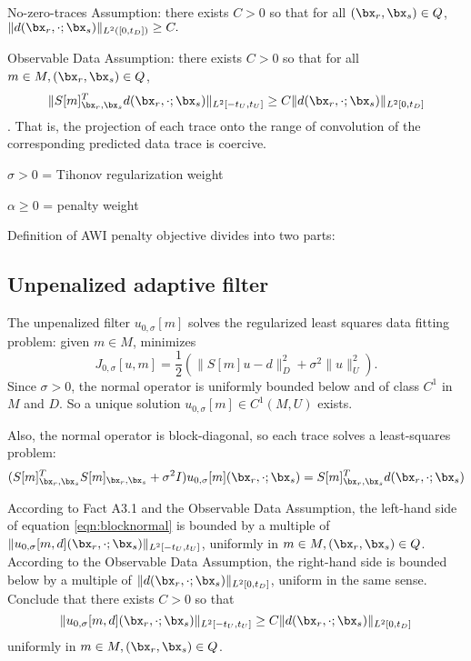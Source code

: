 No-zero-traces Assumption: there exists $C>0$ so that for all $(\bx_r,\bx_s) \in Q$,
$\|d(\bx_r,\cdot;\bx_s)\|_{L^2([0,t_D])} \ge C.$

Observable Data Assumption: there exists $C>0$ so that for all $m \in M, (\bx_r,\bx_s) \in Q$,
\begin{equation}
  \label{eqn:obsdata}
  \|S[m]_{\bx_r,\bx_s}^Td(\bx_r,\cdot;\bx_s)\|_{L^2[-t_U,t_U]} \ge C \|d(\bx_r,\cdot;\bx_s)\|_{L^2[0,t_D]}
\end{equation}.
That is, the projection of each trace onto the range of convolution of the corresponding predicted data trace is coercive.  

$\sigma > 0$ = Tihonov regularization weight

$\alpha \ge 0$ = penalty weight

Definition of AWI penalty objective divides into two parts:

\subsection{ Unpenalized adaptive filter}
The unpenalized filter $u_{0,\sigma}[m]$ solves the regularized least squares data fitting problem:  given $m \in M$, minimizes
\[
 J_{0,\sigma}[u,m] = \frac{1}{2}(\|S[m]u - d\|_D^2 + \sigma^2 \|u\|^2_U).
\]
Since $\sigma > 0$, the normal operator is uniformly bounded below and of class $C^1$ in $M$ and $D$. So a unique solution $u_{0,\sigma}[m] \in C^1(M, U)$ exists.

Also, the normal operator is block-diagonal, so each trace solves a least-squares problem:
\begin{equation}
  \label{eqn:blocknormal}
  (S[m]_{\bx_r,\bx_s}^TS[m]_{\bx_r,\bx_s} + \sigma^2 I)u_{0,\sigma}[m](\bx_r,\cdot; \bx_s)= S[m]_{\bx_r,\bx_s}^Td(\bx_r,\cdot;\bx_s)
\end{equation}

According to Fact A3.1 and the Observable Data Assumption, the left-hand side of equation \ref{eqn:blocknormal} is bounded by a multiple of $\|u_{0,\sigma}[m,d](\bx_r,\cdot; \bx_s)\|_{L^2[-t_U,t_U]}$, uniformly in $m \in M, (\bx_r,\bx_s) \in Q$. According to the Observable Data Assumption, the right-hand side is bounded below by a multiple of $\|d(\bx_r,\cdot;\bx_s)\|_{L^2[0,t_D]}$, uniform in the same sense. Conclude that there exists $C>0$ so that
\begin{equation}
  \label{eqn:u0lower}
  \|u_{0,\sigma}[m,d](\bx_r,\cdot; \bx_s)\|_{L^2[-t_U,t_U]} \ge C \|d(\bx_r,\cdot;\bx_s)\|_{L^2[0,t_D]}
\end{equation}
uniformly in $m \in M, (\bx_r,\bx_s) \in Q$.

